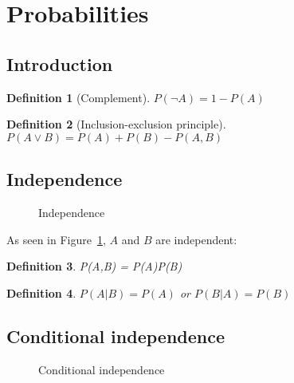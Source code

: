 \documentclass{report}
\newtheorem{definition}{Definition}[section]
\begin{document}
\section{Probabilities}
\subsection{Introduction}

\begin{definition}[Complement]
$P(\neg A) = 1 - P(A)$
\end{definition}

\begin{definition}[Inclusion-exclusion principle]
$P(A\vee B) =P(A) + P(B) - P(A,B)$
\end{definition}


\subsection{Independence}

\begin{figure}[h!]
\centering
{}
\caption{Independence}
\label{ref:independence}
\end{figure}

As seen in Figure~\ref{ref:independence}, $A$ and $B$ are independent:
\begin{definition}
P(A,B) = P(A)P(B)
\end{definition}

\begin{definition}
$P(A\vert B) = P(A)$ or $P(B\vert A) = P(B)$ 
\end{definition}


\subsection{Conditional independence}

\begin{figure}[h!]
\centering
{}
\caption{Conditional independence}
\label{ref:condindependence1}
\end{figure}
\end{document}
